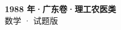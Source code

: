 \documentclass[zihao=-4, a4paper]{ctexart}
\begin{document}
\begin{center}
  {\Large\bfseries 1988 年·广东卷·理工农医类}\\[4pt]
  {\large 数学 · 试题版}
\end{center}
\medskip
{}

\end{document}
